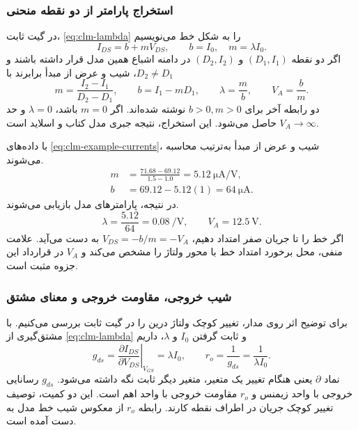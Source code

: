 \subsubsection*{استخراج پارامتر از دو نقطه منحنی}
در گیت ثابت، \eqref{eq:clm-lambda} را به شکل خط می‌نویسیم
\begin{equation}
 I_{DS}=b+mV_{DS},\qquad b=I_0,\quad m=\lambda I_0.
 \label{eq:clm-line}
\end{equation}
اگر دو نقطه \((D_1,I_1)\) و \((D_2,I_2)\) در دامنه اشباع همین مدل
قرار داشته باشند و \(D_2\ne D_1\)، شیب و عرض از مبدأ برابرند با
\begin{equation}
 m=\frac{I_2-I_1}{D_2-D_1},\qquad
 b=I_1-mD_1,\qquad
 \lambda=\frac{m}{b},\qquad V_A=\frac{b}{m}.
 \label{eq:clm-extraction}
\end{equation}
دو رابطه آخر برای \(b>0,m>0\) نوشته شده‌اند. اگر \(m=0\) باشد،
\(\lambda=0\) و حد \(V_A\to\infty\) حاصل می‌شود.
این استخراج، نتیجه جبری مدل کتاب و اسلاید است.

با داده‌های \eqref{eq:clm-example-currents}، شیب و عرض از مبدأ
به‌ترتیب محاسبه می‌شوند.
\[
 \begin{aligned}
 m&=\frac{71.68-69.12}{1.5-1.0}=\qty{5.12}{\micro\ampere\per\volt},\\
 b&=69.12-5.12(1)=\qty{64}{\micro\ampere}.
 \end{aligned}
\]
در نتیجه، پارامترهای مدل بازیابی می‌شوند.
\[
 \lambda=\frac{5.12}{64}=\qty{0.08}{\per\volt},\qquad
 V_A=\qty{12.5}{\volt}.
\]
اگر خط را تا جریان صفر امتداد دهیم،
\(V_{DS}=-b/m=-V_A\) به دست می‌آید. علامت منفی، محل برخورد امتداد
خط با محور ولتاژ را مشخص می‌کند و \(V_A\) در قرارداد این جزوه مثبت است.

\subsubsection*{شیب خروجی، مقاومت خروجی و معنای مشتق}
برای توضیح اثر روی مدار، تغییر کوچک ولتاژ درین را در گیت ثابت بررسی
می‌کنیم. با مشتق‌گیری از \eqref{eq:clm-lambda} و ثابت گرفتن
\(I_0\) و \(\lambda\)، داریم
\begin{equation}
 g_{ds}=\left.\frac{\partial I_{DS}}{\partial V_{DS}}\right|_{V_{GS}}
 =\lambda I_0,\qquad
 r_o=\frac{1}{g_{ds}}=\frac{1}{\lambda I_0}.
 \label{eq:output-conductance}
\end{equation}
نماد \(\partial\) یعنی هنگام تغییر یک متغیر، متغیر دیگر ثابت نگه داشته
می‌شود. \(g_{ds}\) رسانایی خروجی با واحد زیمنس و \(r_o\) مقاومت خروجی
با واحد اهم است. این دو کمیت، توصیف تغییر کوچک جریان در اطراف نقطه کارند.
رابطه \(r_o\) از معکوس شیب خط مدل به دست آمده است.

